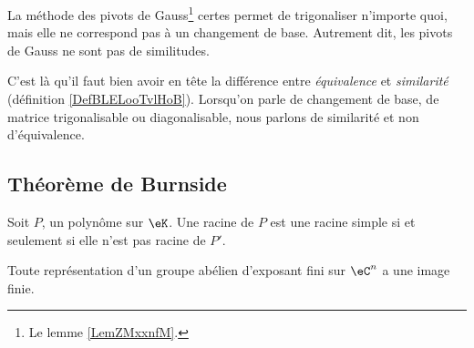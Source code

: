 \begin{remark}
    La méthode des pivots de Gauss\footnote{Le lemme \ref{LemZMxxnfM}.} certes permet de trigonaliser n'importe quoi, mais elle ne correspond pas à un changement de base. Autrement dit, les pivots de Gauss ne sont pas de similitudes.

    C'est là qu'il faut bien avoir en tête la différence entre \emph{équivalence} et \emph{similarité} (définition \ref{DefBLELooTvlHoB}). Lorsqu'on parle de changement de base, de matrice trigonalisable ou diagonalisable, nous parlons de similarité et non d'équivalence.
\end{remark}

\subsection{Théorème de Burnside}

\begin{lemma}       \label{LemwXXzIt}
    Soit \( P\), un polynôme sur \( \eK\). Une racine de \( P\) est une racine simple si et seulement si elle n'est pas racine de \( P'\).
\end{lemma}

\begin{theorem}     \label{ThoBurnsideoPuCtS}
    Toute représentation d'un groupe abélien d'exposant fini sur \( \eC^n\) a une image finie.
\end{theorem}

